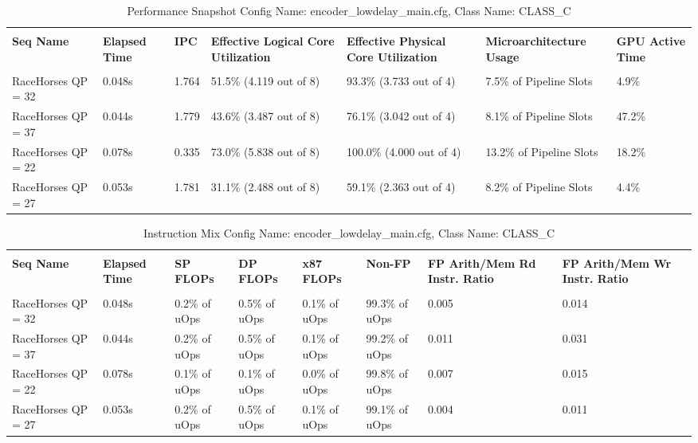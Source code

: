 \documentclass{article}%
\begin{document}
\begin{longtabu}{| X[l] | X[l] | X[l] | X[l] | X[l] | X[l] | X[l] |}%
\caption{%
Performance Snapshot\newline%
 Config Name: encoder\_lowdelay\_main.cfg,\newline%
 Class Name: CLASS\_C\newline%
%
}%
\hline%
&&&&&&\\%
\textbf{Seq Name}&\textbf{Elapsed Time}&\textbf{IPC}&\textbf{Effective Logical Core Utilization}&\textbf{Effective Physical Core Utilization}&\textbf{Microarchitecture Usage}&\textbf{GPU Active Time}\\%
&&&&&&\\%
\hline%
\endhead%
RaceHorses\newline%
 QP = 32&0.048s&1.764&51.5\% (4.119 out of 8)&93.3\% (3.733 out of 4)&7.5\% of Pipeline Slots&4.9\%\\%
\hline%
RaceHorses\newline%
 QP = 37&0.044s&1.779&43.6\% (3.487 out of 8)&76.1\% (3.042 out of 4)&8.1\% of Pipeline Slots&47.2\%\\%
\hline%
RaceHorses\newline%
 QP = 22&0.078s&0.335&73.0\% (5.838 out of 8)&100.0\% (4.000 out of 4)&13.2\% of Pipeline Slots&18.2\%\\%
\hline%
RaceHorses\newline%
 QP = 27&0.053s&1.781&31.1\% (2.488 out of 8)&59.1\% (2.363 out of 4)&8.2\% of Pipeline Slots&4.4\%\\%
\hline%
\end{longtabu}%
\begin{longtabu}{| X[l] | X[l] | X[l] | X[l] | X[l] | X[l] | X[l] | X[l] |}%
\caption{%
Instruction Mix\newline%
 Config Name: encoder\_lowdelay\_main.cfg,\newline%
 Class Name: CLASS\_C\newline%
%
}%
\hline%
&&&&&&&\\%
\textbf{Seq Name}&\textbf{Elapsed Time}&\textbf{SP FLOPs}&\textbf{DP FLOPs}&\textbf{x87 FLOPs}&\textbf{Non{-}FP}&\textbf{FP Arith/Mem Rd Instr. Ratio}&\textbf{FP Arith/Mem Wr Instr. Ratio}\\%
&&&&&&&\\%
\hline%
\endhead%
RaceHorses\newline%
 QP = 32&0.048s&0.2\% of uOps&0.5\% of uOps&0.1\% of uOps&99.3\% of uOps&0.005&0.014\\%
\hline%
RaceHorses\newline%
 QP = 37&0.044s&0.2\% of uOps&0.5\% of uOps&0.1\% of uOps&99.2\% of uOps&0.011&0.031\\%
\hline%
RaceHorses\newline%
 QP = 22&0.078s&0.1\% of uOps&0.1\% of uOps&0.0\% of uOps&99.8\% of uOps&0.007&0.015\\%
\hline%
RaceHorses\newline%
 QP = 27&0.053s&0.2\% of uOps&0.5\% of uOps&0.1\% of uOps&99.1\% of uOps&0.004&0.011\\%
\hline%
\end{longtabu}%
\end{document}
